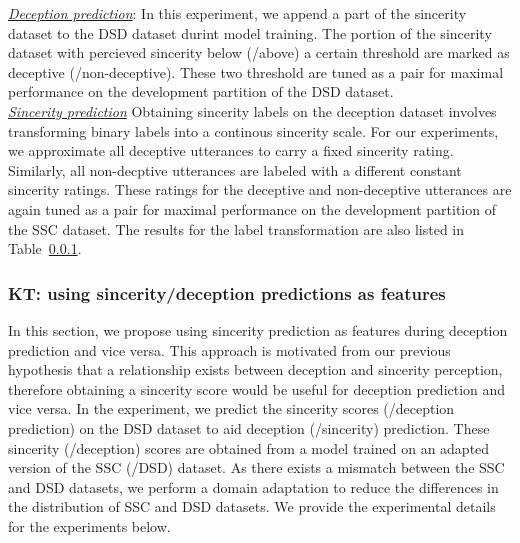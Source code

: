 \documentclass{article}
\begin{document}
\noindent\underline{\it Deception prediction}: 
In this experiment, we append a part of the sincerity dataset to the DSD dataset durint model training.
The portion of the sincerity dataset with percieved sincerity below (/above) a certain threshold are marked as deceptive (/non-deceptive). 
These two threshold are tuned as a pair for maximal performance on the development partition of the DSD dataset. 
\\

\noindent\underline{\it Sincerity prediction}
Obtaining sincerity labels on the deception dataset involves transforming binary labels into a continous sincerity scale.
For our experiments, we approximate all deceptive utterances to carry a fixed sincerity rating. 
Similarly, all non-decptive utterances are labeled with a different constant sincerity ratings.
These ratings for the deceptive and non-deceptive utterances are again tuned as a pair for maximal performance on the development partition of the SSC dataset.
The results for the label transformation are also listed in Table~\ref{}.

\subsubsection{KT: using sincerity/deception predictions as features}
In this section, we propose using sincerity prediction as features during deception prediction and vice versa.
This approach is motivated from our previous hypothesis that a relationship exists between deception and sincerity perception, therefore obtaining a sincerity score would be useful for deception prediction and vice versa.
In the experiment, we predict the sincerity scores (/deception prediction) on the DSD dataset to aid deception (/sincerity) prediction. 
These sincerity (/deception) scores are obtained from a model trained on an adapted version of the SSC (/DSD) dataset.
As there exists a mismatch between the SSC and DSD datasets, we perform a domain adaptation to reduce the differences in the distribution of SSC and DSD datasets.
We provide the experimental details for the experiments below.
\\
\end{document}

